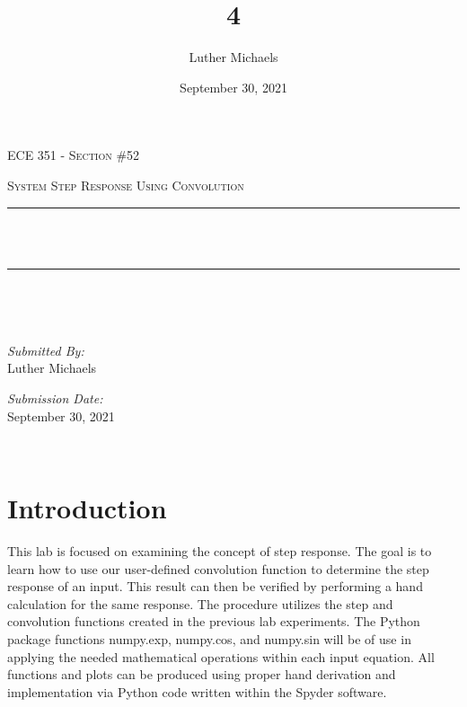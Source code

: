 \documentclass[12pt]{report}
\title{4}	%
\author{Luther Michaels}	%
\date{September 30, 2021}   %
\makeatletter
\let\thetitle\@title
\makeatother
\begin{document}
	
\begin{titlepage}
	\centering
	\vspace*{0.5 cm}
	
	\begin{center}    
		\textsc{\Large   ECE 351 - Section \#52}\\[2.0 cm]	
	\end{center}  
	\textsc{\Large System Step Response Using Convolution }\\[0.5 cm]
	\rule{\linewidth}{0.2 mm} \\[0.4 cm]
	{ \huge \bfseries \thetitle}\\
	\rule{\linewidth}{0.2 mm} \\[1.5 cm]
	\begin{minipage}{0.4\textwidth}
		\begin{flushleft} \large
		\end{flushleft}
	\end{minipage}~
	\begin{minipage}{0.4\textwidth}
		\begin{flushright} \large
			\emph{Submitted By:} \\
			Luther Michaels \break
			
			\emph{Submission Date:} \\
			September 30, 2021
		\end{flushright}
	\end{minipage}\\[2 cm]
\end{titlepage}
	
	
\tableofcontents
\pagebreak
	
\renewcommand{\thesection}{\arabic{section}}
\section{Introduction}
	
This lab is focused on examining the concept of step response. The goal is to learn how to use our user-defined convolution function to determine the step response of an input. This result can then be verified by performing a hand calculation for the same response. The procedure utilizes the step and convolution functions created in the previous lab experiments. The Python package functions numpy.exp, numpy.cos, and numpy.sin will be of use in applying the needed mathematical operations within each input equation. All functions and plots can be produced using proper hand derivation and implementation via Python code written within the Spyder software. \\
	
\end{document}
